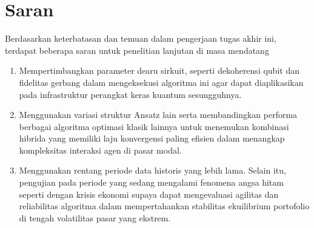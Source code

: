 \section{Saran}
Berdasarkan keterbatasan dan temuan dalam pengerjaan tugas akhir ini, terdapat beberapa saran untuk penelitian lanjutan di masa mendatang
\begin{enumerate}
    \item Mempertimbangkan parameter dearu sirkuit, seperti dekoherensi qubit dan fidelitas gerbang dalam mengeksekusi algoritma ini agar dapat diaplikasikan pada infrastruktur perangkat keras kuantum sesungguhnya.
    \item Menggunakan variasi struktur Ansatz lain serta membandingkan performa berbagai algoritma optimasi klasik lainnya untuk menemukan kombinasi hibrida yang memiliki laju konvergensi paling efisien dalam menangkap kompleksitas interaksi agen di pasar modal.
    \item Menggunakan rentang periode data historis yang lebih lama. Selain itu, pengujian pada periode yang sedang mengalami fenomena angsa hitam seperti dengan krisis ekonomi supaya dapat mengevaluasi agilitas dan reliabilitas algoritma dalam mempertahankan stabilitas ekuilibrium portofolio di tengah volatilitas pasar yang ekstrem.
\end{enumerate}
